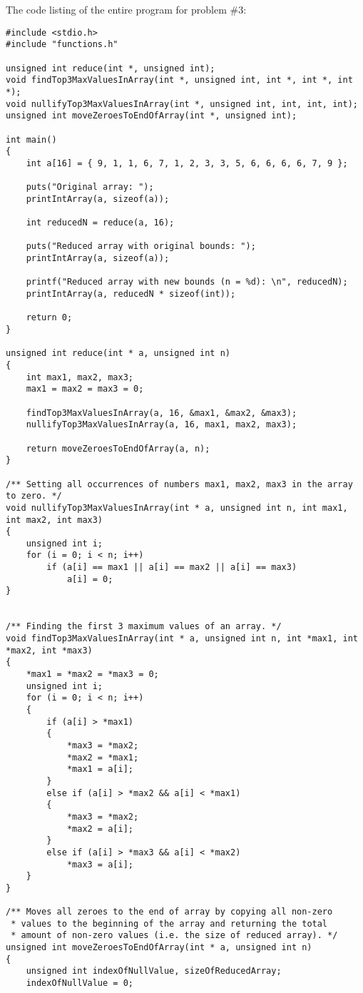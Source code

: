 \documentclass{article}
\begin{document}
	
		\rmfamily
		\noindent The code listing of the entire program for problem \#3:
		\begin{verbatim}
#include <stdio.h>
#include "functions.h"

unsigned int reduce(int *, unsigned int);
void findTop3MaxValuesInArray(int *, unsigned int, int *, int *, int *);
void nullifyTop3MaxValuesInArray(int *, unsigned int, int, int, int);
unsigned int moveZeroesToEndOfArray(int *, unsigned int);

int main()
{
    int a[16] = { 9, 1, 1, 6, 7, 1, 2, 3, 3, 5, 6, 6, 6, 6, 7, 9 };

    puts("Original array: ");
    printIntArray(a, sizeof(a));

    int reducedN = reduce(a, 16);

    puts("Reduced array with original bounds: ");
    printIntArray(a, sizeof(a));

    printf("Reduced array with new bounds (n = %d): \n", reducedN);
    printIntArray(a, reducedN * sizeof(int));

    return 0;
}

unsigned int reduce(int * a, unsigned int n)
{
    int max1, max2, max3;
    max1 = max2 = max3 = 0;

    findTop3MaxValuesInArray(a, 16, &max1, &max2, &max3);
    nullifyTop3MaxValuesInArray(a, 16, max1, max2, max3);

    return moveZeroesToEndOfArray(a, n);
}

/** Setting all occurrences of numbers max1, max2, max3 in the array to zero. */
void nullifyTop3MaxValuesInArray(int * a, unsigned int n, int max1, int max2, int max3)
{
    unsigned int i;
    for (i = 0; i < n; i++)
        if (a[i] == max1 || a[i] == max2 || a[i] == max3)
            a[i] = 0;
}


/** Finding the first 3 maximum values of an array. */
void findTop3MaxValuesInArray(int * a, unsigned int n, int *max1, int *max2, int *max3)
{
    *max1 = *max2 = *max3 = 0;
    unsigned int i;
    for (i = 0; i < n; i++)
    {
        if (a[i] > *max1)
        {
            *max3 = *max2;
            *max2 = *max1;
            *max1 = a[i];
        }
        else if (a[i] > *max2 && a[i] < *max1)
        {
            *max3 = *max2;
            *max2 = a[i];
        }
        else if (a[i] > *max3 && a[i] < *max2)
            *max3 = a[i];
    }
}

/** Moves all zeroes to the end of array by copying all non-zero
 * values to the beginning of the array and returning the total
 * amount of non-zero values (i.e. the size of reduced array). */
unsigned int moveZeroesToEndOfArray(int * a, unsigned int n)
{
    unsigned int indexOfNullValue, sizeOfReducedArray;
    indexOfNullValue = 0;


\end{verbatim}
\end{document}
